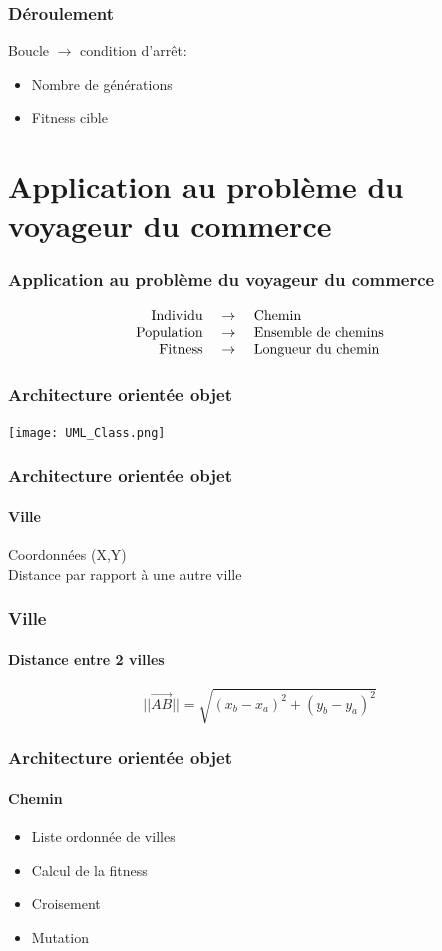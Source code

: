 \documentclass[16pt]{beamer}
\begin{document}
\begin{frame}
  \frametitle{Déroulement}
  Boucle $\rightarrow$ condition d'arrêt:
  \begin{itemize}
    \item Nombre de générations
    \item Fitness cible 
  \end{itemize}
\end{frame}

\section{Application au problème du voyageur du commerce}
\begin{frame}
  \frametitle{Application au problème du voyageur du commerce}
  \begin{block}{}
\[
  \begin{array}{r c l}
    \text{Individu } &\rightarrow& \text{ Chemin} \\
    \text{Population } &\rightarrow& \text{ Ensemble de chemins} \\
    \text{Fitness } &\rightarrow& \text{ Longueur du chemin} 
   \end{array}{}
\]
\end{block}
\end{frame}

\begin{frame}
\frametitle{Architecture orientée objet}
\texttt{[image: UML\_Class.png]}
\end{frame}
\begin{frame}[fragile]
\frametitle{Architecture orientée objet}
\framesubtitle{\textbf{Ville}}
Coordonnées (X,Y) \\
Distance par rapport à une autre ville
\end{frame}

\begin{frame}
  \frametitle{Ville}
  \framesubtitle{Distance entre 2 villes}
  \begin{center}
  \[
    ||\overrightarrow{AB}|| = \sqrt{(x_b - x_a)^2 + (y_b - y_a)^2}
  \]
  \end{center}
\end{frame}

\begin{frame}
  \frametitle{Architecture orientée objet}
  \framesubtitle{\textbf{Chemin}}
  \begin{itemize}
    \item Liste ordonnée de villes
    \item Calcul de la fitness
    \item Croisement
    \item Mutation
  \end{itemize}
\end{frame}
\end{document}
